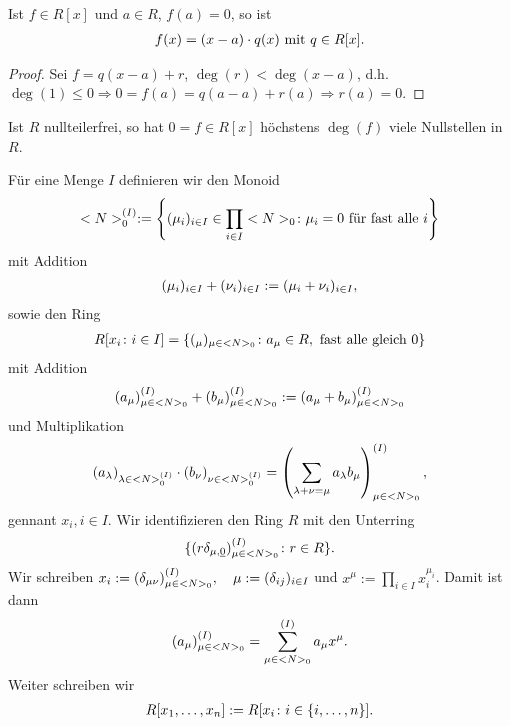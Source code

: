 \begin{conclusion}
	Ist $f \in R[x]$ und $a \in R$, $f(a) = 0$, so ist
	\begin{align}
		f(x) = (x-a)\cdot q(x) \text{ mit } q \in R[x]. \notag
	\end{align}
\end{conclusion}

\begin{proof}
	Sei $f = q(x-a) + r$, $\deg(r) < \deg(x-a)$, d.h. $\deg(1) \leq 0 \Rightarrow 0 = f(a) = q(a-a) + r(a) \Rightarrow r(a) = 0$.
\end{proof}

\begin{conclusion}
	Ist $R$ nullteilerfrei, so hat $0 = f \in R[x]$ höchstens $\deg(f)$ viele Nullstellen in $R$.
\end{conclusion}

\begin{definition}
	Für eine Menge $I$ definieren wir den Monoid
	\begin{align}
	<N>_{0}^{(I)} : = \left\{ (\mu_i)_{i \in I} \in \prod_{i \in I} <N>_{0} \colon \mu_i = 0 \text{ für fast alle } i \right\}\notag
	\end{align}
	mit Addition
	\begin{align}
		(\mu_i)_{i \in I} + (\nu_i)_{i \in I} :=(\mu_i+\nu_i)_{i \in I}, \notag
	\end{align}
	sowie den Ring
	\begin{align}
		R[x_i \colon i \in I] = \{ (_{\mu})_{\mu \in <N>_{0}} \colon a_{\mu} \in R, \text{ fast alle gleich } 0\} \notag
	\end{align}
	mit Addition
	\begin{align}
		(a_{\mu})_{\mu \in <N>_{0}}^{(I)} + (b_{\mu})_{\mu \in <N>_{0}}^{(I)} := (a_{\mu} + b_{\mu})_{\mu \in <N>_{0}}^{(I)} \notag
	\end{align}
	und Multiplikation
	\begin{align}
		(a_{\lambda})_{\lambda \in <N>_{0}^{(I)}}\cdot (b_{\nu})_{\nu \in <N>_{0}^{(I)}} = \left( \sum_{\lambda + \nu = \mu} a_{\lambda}b_{\mu}\right)_{\mu \in <N>_{0}}^{(I)}, \notag
	\end{align}
	gennant  $x_i, i \in I$. Wir identifizieren den Ring $R$ mit den Unterring
	\begin{align}
		\{ (r\delta_{\mu,\underline{0}})_{\mu \in <N>_{0}}^{(I)}\colon r \in R \}. \notag
	\end{align}
	Wir schreiben $x_i := (\delta_{\mu\nu})_{\mu \in <N>_{0}}^{(I)},\quad \mu := (\delta_{ij})_{i \in I}$ und $x^{\mu} := \prod_{i \in I}x_i^{\mu_i}$. Damit ist dann
	\begin{align}
		(a_{\mu})_{\mu \in <N>_{0}}^{(I)} = \sum_{\mu \in <N>_{0}}^{(I)} a_{\mu} x^{\mu}. \notag
	\end{align}
	Weiter schreiben wir
	\begin{align}
		R[x_1, \dots, x_n] := R[x_i \colon i \in \{ i, \dots, n \}]. \notag
	\end{align}
\end{definition}

